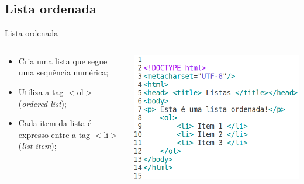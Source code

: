 \documentclass{beamer}
\begin{document}
\subsection{Lista ordenada}
\begin{frame}{Lista ordenada}
  \begin{columns}
    \begin{column}{0.45 \textwidth}
     \begin{itemize}
      \item Cria uma lista que segue uma sequência numérica;
       \item Utiliza a tag $<$ol$>$ (\textit{ordered list});
       \item Cada item da lista é expresso entre a tag $<$li$>$ 
      (\textit{list item});
     \end{itemize}
    \end{column}
    \begin{column}{0.5\textwidth}
     \includegraphics[height=0.45\paperheight]{fig/aula1/html2.png}
    \end{column}
  \end{columns}
\end{frame}
\end{document}
